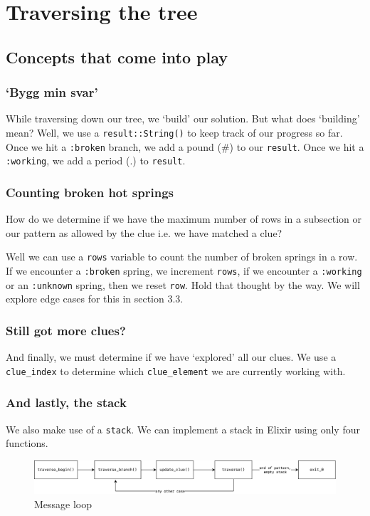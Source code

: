 \section{Traversing the tree}
\subsection{Concepts that come into play}
\subsubsection{`Bygg min svar'}
While traversing down our tree, we `build' our solution. But what does `building' mean?
Well, we use a \texttt{result::String()} to keep track of our progress so far. Once we hit a \texttt{:broken} branch, we add a pound (\#) to our \texttt{result}. Once we hit a \texttt{:working}, we add a period (.) to \texttt{result}.

\subsubsection{Counting broken hot springs}
How do we determine if we have the maximum number of rows in a subsection or our pattern as allowed by the clue i.e. we have matched a clue? 

Well we can use a \texttt{rows} variable to count the number of broken springs in a row. If we encounter a \texttt{:broken} spring, we increment \texttt{rows}, if we encounter a \texttt{:working} or an \texttt{:unknown} spring, then we reset \texttt{row}.
Hold that thought by the way. We will explore edge cases for this in section 3.3.

\subsubsection{Still got more clues?}
And finally, we must determine if we have `explored' all our clues. We use a \texttt{clue\_index} to determine which \texttt{clue\_element} we are currently working with.

\subsubsection{And lastly, the stack}
We also make use of a \texttt{stack}. We can implement a stack in Elixir using only four functions.



\begin{figure}
    \includegraphics[width=\textwidth]{img/message_loop_h}
    \caption{Message loop}
\end{figure}

